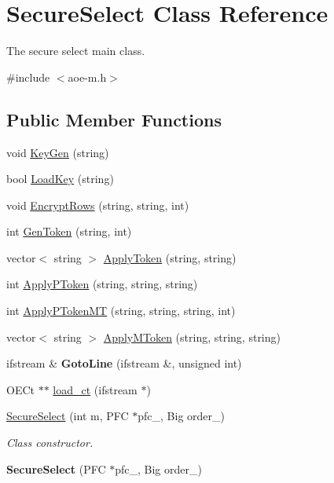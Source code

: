 \hypertarget{classSecureSelect}{\section{Secure\-Select Class Reference}
\label{classSecureSelect}
}


The secure select main class.  




{\ttfamily \#include $<$aoe-\/m.\-h$>$}

\subsection*{Public Member Functions}
\begin{DoxyCompactItemize}
\item 
void \hyperlink{classSecureSelect_a72c8b1ac19619a6eeaa722f766e53b3f}{Key\-Gen} (string)
\item 
bool \hyperlink{classSecureSelect_ad7a2125393de550771e4e9177a1552b3}{Load\-Key} (string)
\item 
void \hyperlink{classSecureSelect_ada64a34744ec0598327f8e926c7fa2d6}{Encrypt\-Rows} (string, string, int)
\item 
int \hyperlink{classSecureSelect_a88e8f870930dfbeae24d355412b1d0a3}{Gen\-Token} (string, int)
\item 
vector$<$ string $>$ \hyperlink{classSecureSelect_a55312fbd535adba75ba328d060faff35}{Apply\-Token} (string, string)
\item 
int \hyperlink{classSecureSelect_aab33712ef6fbbe6922a2d8156b88dc27}{Apply\-P\-Token} (string, string, string)
\item 
int \hyperlink{classSecureSelect_a1a556c61d392fa9d2dfd1eb6684bafc1}{Apply\-P\-Token\-M\-T} (string, string, string, int)
\item 
vector$<$ string $>$ \hyperlink{classSecureSelect_a4b912c3407b0664ae37d2ccfce4eafc5}{Apply\-M\-Token} (string, string, string)
\item 
\hypertarget{classSecureSelect_a177b3724ce3e8ea4695b2950546d596d}{ifstream \& {\bfseries Goto\-Line} (ifstream \&, unsigned int)}\label{classSecureSelect_a177b3724ce3e8ea4695b2950546d596d}

\item 
O\-E\-Ct $\ast$$\ast$ \hyperlink{classSecureSelect_a2163cc84d91843d5ba52876cf75d9d83}{load\-\_\-ct} (ifstream $\ast$)
\item 
\hyperlink{classSecureSelect_a88cd629de7214c05eb86683b058bacd5}{Secure\-Select} (int m, P\-F\-C $\ast$pfc\-\_\-, Big order\-\_\-)
\begin{DoxyCompactList}\small\item\em Class constructor. \end{DoxyCompactList}\item 
\hypertarget{classSecureSelect_a3270108d70fee40d40a28ebccee7ed2a}{{\bfseries Secure\-Select} (P\-F\-C $\ast$pfc\-\_\-, Big order\-\_\-)}\label{classSecureSelect_a3270108d70fee40d40a28ebccee7ed2a}

\end{DoxyCompactItemize}
